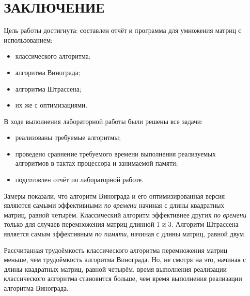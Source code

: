 \section*{ЗАКЛЮЧЕНИЕ}

Цель работы достигнута: составлен отчёт и программа для умножения матриц с использованием:
\begin{itemize}
	\item классического алгоритма;
	\item алгоритма Винограда;
	\item алгоритма Штрассена;
	\item их же с оптимизациями.
\end{itemize}

В ходе выполнения лабораторной работы были решены все задачи:
\begin{itemize}
	\item реализованы требуемые алгоритмы;
	\item проведено сравнение требуемого времени выполнения реализуемых алгоритмов в тактах процессора и занимаемой памяти;
	\item подготовлен отчёт по лабораторной работе.
\end{itemize}

Замеры показали, что алгоритм Винограда и его оптимизированная версия являются самыми эффективными \textit{по времени} начиная с длины квадратных матриц, равной четырём.
Классический алгоритм эффективнее других \textit{по времени} только для случаев перемножения матриц длинной 1 и 3.
Алгоритм Штрассена является самым эффективным \textit{по памяти}, начиная с длины матриц, равной двум.

Рассчитанная трудоёмкость классического алгоритма перемножения матриц меньше, чем трудоёмкость алгоритма Винограда.
Но, не смотря на это, начиная с длины квадратных матриц, равной четырём, время выполнения реализации классического алгоритма становится больше, чем время выполнения реализации алгоритма Винограда.